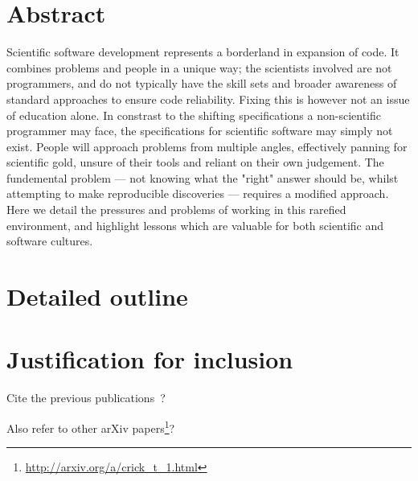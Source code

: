 \documentclass[a4paper,11pt]{article}
\begin{document}
\section*{Abstract}

Scientific software development represents a borderland in expansion
of code. It combines problems and people in a unique way; the scientists
involved are not programmers, and do not typically have the skill sets
and broader awareness of standard approaches to ensure code reliability.
Fixing this is however not an issue of education alone. In constrast to 
the shifting specifications a non-scientific programmer may face, the 
specifications for scientific software may simply not exist. People 
will approach problems from multiple angles, effectively panning for 
scientific gold, unsure of their tools and reliant on their own judgement.
The fundemental problem --- not knowing what the "right" answer should be, 
whilst attempting to make reproducible discoveries --- requires a modified 
approach. Here we detail the pressures and problems of working in this 
rarefied environment, and highlight lessons which are valuable for 
both scientific and software cultures.

\section*{Detailed outline}

\section*{Justification for inclusion}

Cite the previous
publications~\cite{crick-et-al_wssspe2,crick-et-al_recomp2014,crick-et-al_jors,crick-et-al_cse2015}?

Also refer to other arXiv papers\footnote{\url{http://arxiv.org/a/crick_t_1.html}}?




\end{document}
